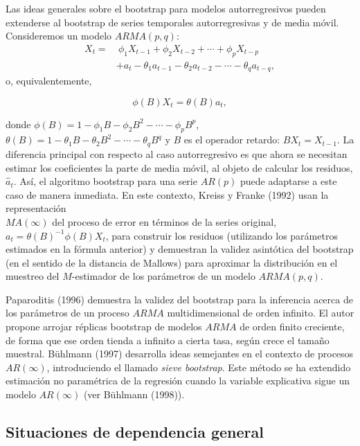 \documentclass[]{book}
\theoremstyle{definition}
\theoremstyle{definition}
\theoremstyle{definition}
\theoremstyle{remark}
\begin{document}
Las ideas generales sobre el bootstrap para modelos autorregresivos
pueden extenderse al bootstrap de series temporales autorregresivas y de
media móvil. Consideremos un modelo \(ARMA(p,q)\): \[\begin{aligned}
X_{t} =&\ \phi _1X_{t-1}+\phi _2X_{t-2}+\cdots +\phi _{p}X_{t-p} \\
&+a_{t}-\theta _1a_{t-1}-\theta _2a_{t-2}-\cdots -\theta _{q}a_{t-q},\end{aligned}\]o,
equivalentemente,

\[\phi (B)X_{t}=\theta (B)a_{t},\]

donde \(\phi (B)=1-\phi _1B-\phi _2B^2-\cdots -\phi _{p}B^{p}\),
\(\theta(B)=1-\theta _1B-\theta _2B^2-\cdots -\theta _{q}B^{q}\) y \(B\)
es el operador retardo: \(BX_{t}=X_{t-1}\). La diferencia principal con
respecto al caso autorregresivo es que ahora se necesitan estimar los
coeficientes la parte de media móvil, al objeto de calcular los
residuos, \(\widehat{a}_{t}\). Así, el algoritmo bootstrap para una
serie \(AR(p)\) puede adaptarse a este caso de manera inmediata. En este
contexto, Kreiss y Franke (1992) usan la representación\\
\(MA(\infty )\) del proceso de error en términos de la series original,
\(a_{t}=\theta (B)^{-1}\phi(B) X_{t}\), para construir los residuos
(utilizando los parámetros estimados en la fórmula anterior) y
demuestran la validez asintótica del bootstrap (en el sentido de la
distancia de Mallows) para aproximar la distribución en el muestreo del
\(M\)-estimador de los parámetros de un modelo \(ARMA(p,q)\).

Paparoditis (1996) demuestra la validez del bootstrap para la inferencia
acerca de los parámetros de un proceso \(ARMA\) multidimensional de
orden infinito. El autor propone arrojar réplicas bootstrap de modelos
\(ARMA\) de orden finito creciente, de forma que ese orden tienda a
infinito a cierta tasa, según crece el tamaño muestral. Bühlmann (1997)
desarrolla ideas semejantes en el contexto de procesos
\(AR\left( \infty \right)\), introduciendo el llamado \emph{sieve
bootstrap}. Este método se ha extendido estimación no paramétrica de la
regresión cuando la variable explicativa sigue un modelo
\(AR\left( \infty \right)\) (ver Bühlmann (1998)).

\subsection{Situaciones de dependencia
general}\label{situaciones-de-dependencia-general-1}
\end{document}
